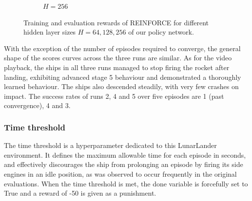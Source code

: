 \documentclass[a4paper, 11pt]{article}
\begin{document}
\begin{figure}[ht]
\begin{center}
\begin{subfigure}{0.48\textwidth}
				\caption{$H=256$}
				\label{fig:pg_h256}
			\end{subfigure} 
		\end{center}
		\caption{Training and evaluation rewards of REINFORCE for different hidden layer sizes $H=64,128,256$ of our policy network.}
		\label{fig:pg_h}
	\end{figure}
	
	With the exception of the number of episodes required to converge, the general shape of the scores curves across the three runs are similar. As for the video playback, the ships in all three runs managed to stop firing the rocket after landing, exhibiting advanced stage 5 behaviour and demonstrated a thoroughly learned behaviour. The ships also descended steadily, with very few crashes on impact. The success rates of runs 2, 4 and 5 over five episodes are 1 (past convergence), 4 and 3.
	
	\subsubsection{Time threshold}
	The time threshold is a hyperparameter dedicated to this LunarLander environment. It defines the maximum allowable time for each episode in seconds, and effectively discourages the ship from prolonging an episode by firing its side engines in an idle position, as was observed to occur frequently in the original evaluations. 
	When the time threshold is met, the done variable is forcefully set to True and a reward of -50 is given as a punishment. 
	
\end{document}
